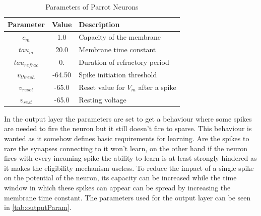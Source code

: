 


      


\begin{table}[htpb]
\caption[Parameters Parrot Neuron]{Parameters of Parrot Neurons} \label{tab:parrotPar}
\centering
\begin{tabular}{|c| c |l|}
    \toprule
    Parameter & Value & Description \\
    \midrule
    $c_m$   & 1.0  & Capacity of the membrane \\
    $tau_{m}$    & 20.0  & Membrane time constant \\
    $tau_{refrac}$   & 0.  & Duration of refractory period\\
    $v_{thresh}$   & -64.50  & Spike initiation threshold \\
    $v_{reset}$    & -65.0  &  Reset value for $V_m$ after a spike \\
		$v_{rest}$ & -65.0 & Resting voltage \\
    \bottomrule
\end{tabular}
\end{table}

In the output layer the parameters are set to get a behaviour where some spikes are needed to fire the neuron but it still doesn’t fire to sparse. This behaviour is wanted as it somehow defines basic requirements for learning. Are the spikes to rare the synapses connecting to it won’t learn, on the other hand if the neuron fires with every incoming spike the ability to learn is at least strongly hindered as it makes the eligibility mechanism useless. To reduce the impact of a single spike on the potential of the neuron, its capacity can be increased while the time window in which these spikes can appear can be spread by increasing the membrane time constant. The parameters used for the output layer can be seen in \autoref{tab:outputParam}.



